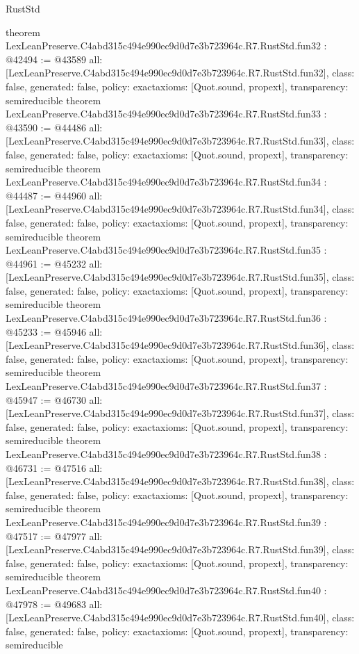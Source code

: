 \begin{lexlean}{RustStd}
\begin{coremodule}
{}
theorem LexLeanPreserve.C4abd315c494e990ec9d0d7e3b723964c.R7.RustStd.fun32 : @42494 := @43589 {
  all: [LexLeanPreserve.C4abd315c494e990ec9d0d7e3b723964c.R7.RustStd.fun32],
  class: false,
  generated: false,
  policy: exact{axioms: [Quot.sound, propext]},
  transparency: semireducible
}
theorem LexLeanPreserve.C4abd315c494e990ec9d0d7e3b723964c.R7.RustStd.fun33 : @43590 := @44486 {
  all: [LexLeanPreserve.C4abd315c494e990ec9d0d7e3b723964c.R7.RustStd.fun33],
  class: false,
  generated: false,
  policy: exact{axioms: [Quot.sound, propext]},
  transparency: semireducible
}
theorem LexLeanPreserve.C4abd315c494e990ec9d0d7e3b723964c.R7.RustStd.fun34 : @44487 := @44960 {
  all: [LexLeanPreserve.C4abd315c494e990ec9d0d7e3b723964c.R7.RustStd.fun34],
  class: false,
  generated: false,
  policy: exact{axioms: [Quot.sound, propext]},
  transparency: semireducible
}
theorem LexLeanPreserve.C4abd315c494e990ec9d0d7e3b723964c.R7.RustStd.fun35 : @44961 := @45232 {
  all: [LexLeanPreserve.C4abd315c494e990ec9d0d7e3b723964c.R7.RustStd.fun35],
  class: false,
  generated: false,
  policy: exact{axioms: [Quot.sound, propext]},
  transparency: semireducible
}
theorem LexLeanPreserve.C4abd315c494e990ec9d0d7e3b723964c.R7.RustStd.fun36 : @45233 := @45946 {
  all: [LexLeanPreserve.C4abd315c494e990ec9d0d7e3b723964c.R7.RustStd.fun36],
  class: false,
  generated: false,
  policy: exact{axioms: [Quot.sound, propext]},
  transparency: semireducible
}
theorem LexLeanPreserve.C4abd315c494e990ec9d0d7e3b723964c.R7.RustStd.fun37 : @45947 := @46730 {
  all: [LexLeanPreserve.C4abd315c494e990ec9d0d7e3b723964c.R7.RustStd.fun37],
  class: false,
  generated: false,
  policy: exact{axioms: [Quot.sound, propext]},
  transparency: semireducible
}
theorem LexLeanPreserve.C4abd315c494e990ec9d0d7e3b723964c.R7.RustStd.fun38 : @46731 := @47516 {
  all: [LexLeanPreserve.C4abd315c494e990ec9d0d7e3b723964c.R7.RustStd.fun38],
  class: false,
  generated: false,
  policy: exact{axioms: [Quot.sound, propext]},
  transparency: semireducible
}
theorem LexLeanPreserve.C4abd315c494e990ec9d0d7e3b723964c.R7.RustStd.fun39 : @47517 := @47977 {
  all: [LexLeanPreserve.C4abd315c494e990ec9d0d7e3b723964c.R7.RustStd.fun39],
  class: false,
  generated: false,
  policy: exact{axioms: [Quot.sound, propext]},
  transparency: semireducible
}
theorem LexLeanPreserve.C4abd315c494e990ec9d0d7e3b723964c.R7.RustStd.fun40 : @47978 := @49683 {
  all: [LexLeanPreserve.C4abd315c494e990ec9d0d7e3b723964c.R7.RustStd.fun40],
  class: false,
  generated: false,
  policy: exact{axioms: [Quot.sound, propext]},
  transparency: semireducible
}
\end{coremodule}
\end{lexlean}
